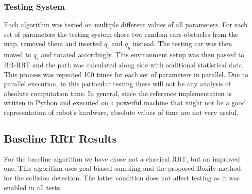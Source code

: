 \documentclass[a4paper,12pt]{article}
\DeclareRobustCommand{\[}{\begin{equation}}
\DeclareRobustCommand{\]}{\end{equation}}
\numberwithin{equation}{section}
\numberwithin{algorithm}{section}
\begin{document}
\subsubsection{Testing System}

Each algorithm was tested on multiple different values of all parameters. 
For each set of parameters the testing system chose two random cars-obstacles from the map, removed them and inserted $q_i$ and $q_g$ instead. The testing car was then
moved to $q_i$ and rotated accordingly. This environment setup was then passed to BR-RRT and the path was calculated along side with additional statistical data.
This process was repeated 100 times for each set of parameters in parallel. Due to parallel execution, in this particular testing there will not be any analysis of
absolute computation time. In general, since the reference implementation is written in Python and executed on a powerful machine
that might not be a good representation of robot's hardware, absolute values of time are not very useful.

\subsection{Baseline RRT Results}

For the baseline algorithm we have chose not a classical RRT, but an improved one.
This algorithm uses goal-biased sampling and the proposed Boxify method for the collision detection. The latter condition does not affect testing as it was enabled in all tests.
\end{document}
